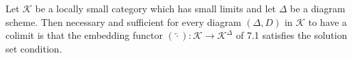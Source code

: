 Let $\mathcal{K}$ be a locally small category which has small limits and let $\Delta$ be a diagram scheme. Then necessary and sufficient for every diagram $(\Delta, D)$ in $\mathcal{K}$ to have a colimit is that the embedding functor $(\tilde{\cdot}): \mathcal{K} \longrightarrow \mathcal{K}^{\Delta}$ of 7.1 satisfies the solution set condition.
